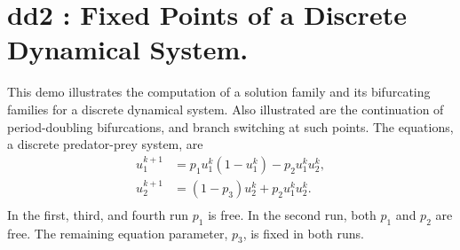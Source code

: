 \documentclass[12pt]{report}
\begin{document}
\section{ dd2 : Fixed Points of a Discrete Dynamical System.} \label{sec:Demos_dd2}
This demo illustrates the computation of a solution family and
its bifurcating families for a discrete dynamical system.
Also illustrated are the continuation of 
period-doubling bifurcations, and branch switching at such
points.
The equations, a discrete predator-prey system, are
\begin{equation} \begin{array}{cl}
 u_1^{k+1} &=p_1
 u_1^{k}(1-u_1^{k})-p_2u_1^{k} u_2^{k},\\
 u_2^{k+1}&=(1-p_3)u_2^{k}+p_2u_1^{k}u_2^{k}.\\
\end{array} \end{equation}
In the first, third, and fourth run $p_1$ is free.
In the second run, both $p_1$ and $p_2$ are free.
The remaining equation parameter, $p_3$, is fixed in both runs.
\end{document}
